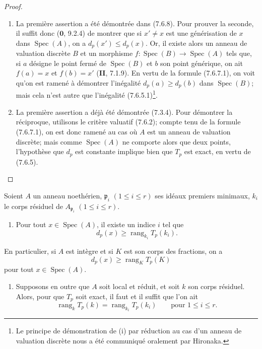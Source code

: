 \begin{proof}
\begin{enumerate}
  \item[(i)] La première assertion a été démontrée dans (7.6.8). Pour prouver
    la seconde, il suffit donc ($\mathbf{0}$, 9.2.4) de montrer que si $x'\ne x$ est une
    générisation de $x$ dans $\operatorname{Spec}(A)$, on a
    $d_p(x')\leq d_p(x)$. Or, il existe alors un anneau de valuation discrète
    $B$ et un morphisme
    $f:\operatorname{Spec}(B)\longrightarrow\operatorname{Spec}(A)$
    tels que, si $a$ désigne le point fermé de $\operatorname{Spec}(B)$ et $b$
    son point générique, on ait $f(a)=x$ et $f(b)=x'$ (\textbf{II}, 7.1.9). En vertu de
    la formule (7.6.7.1), on voit qu'on est ramené à démontrer l'inégalité
    $d_p(a)\geq d_p(b)$ dans $\operatorname{Spec}(B)$; mais cela n'est autre que
    l'inégalité (7.6.5.1)\footnote{Le principe de démonstration de (i) par
    réduction au cas d'un anneau de valuation discrète nous a été communiqué
    oralement par Hironaka.}.
  \item[(ii)] La première assertion a déjà été démontrée (7.3.4). Pour démontrer
    la réciproque, utilisons le critère valuatif (7.6.2); compte tenu de la
    formule (7.6.7.1), on est donc ramené au cas où $A$ est un anneau de
    valuation discrète; mais comme $\operatorname{Spec}(A)$ ne comporte alors
    que deux points, l'hypothèse que $d_p$ est constante implique bien que $T_p$
    est exact, en vertu de (7.6.5).
\end{enumerate}
\end{proof}

\begin{corollary}[7.6.10]
Soient $A$ un anneau noethérien, $\mathfrak p_i$ $(1\leq i\leq r)$ ses idéaux
premiers minimaux, $k_i$ le corps résiduel de $A_{\mathfrak p_i}$
$(1\leq i\leq r)$.
\begin{enumerate}
  \item[\textup{(i)}] Pour tout $x\in\operatorname{Spec}(A)$, il existe un indice $i$
    tel que
    \[
      d_p(x)\geq\operatorname{rang}_{k_i}T_p(k_i).
      \tag{7.6.10.1}\label{III.7.6.10.1.fr}
    \]
\end{enumerate}

En particulier, si $A$ est intègre et si $K$ est son corps des fractions, on a
\[
  d_p(x)\geq\operatorname{rang}_K T_p(K)
  \tag{7.6.10.2}\label{III.7.6.10.2.fr}
\]
pour tout $x\in\operatorname{Spec}(A)$.
\begin{enumerate}
  \item[\textup{(ii)}] Supposons en outre que $A$ soit local et réduit, et soit $k$ son
    corps résiduel. Alors, pour que $T_p$ soit exact, il faut et il suffit que
    l'on ait
    \[
      \operatorname{rang}_k T_p(k)
      =
      \operatorname{rang}_{k_i}T_p(k_i)
      \qquad\text{pour }1\leq i\leq r.
      \tag{7.6.10.3}\label{III.7.6.10.3.fr}
    \]
\end{enumerate}
\end{corollary}

